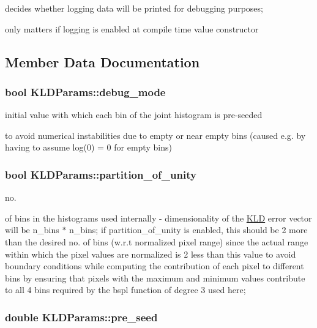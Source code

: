 decides whether logging data will be printed for debugging purposes; 

only matters if logging is enabled at compile time value constructor 

\subsection{Member Data Documentation}
\hypertarget{structKLDParams_a6d3291657c80427cc7ff6b443785b153}{
\subsubsection[{debug\-\_\-mode}]{\setlength{\rightskip}{0pt plus 5cm}bool K\-L\-D\-Params\-::debug\-\_\-mode}}\label{structKLDParams_a6d3291657c80427cc7ff6b443785b153}


initial value with which each bin of the joint histogram is pre-\/seeded 

to avoid numerical instabilities due to empty or near empty bins (caused e.\-g. by having to assume log(0) = 0 for empty bins) \hypertarget{structKLDParams_a3ff869b777a4da12a6363efb3cfa7c96}{
\subsubsection[{partition\-\_\-of\-\_\-unity}]{\setlength{\rightskip}{0pt plus 5cm}bool K\-L\-D\-Params\-::partition\-\_\-of\-\_\-unity}}\label{structKLDParams_a3ff869b777a4da12a6363efb3cfa7c96}


no. 

of bins in the histograms used internally -\/ dimensionality of the \hyperlink{classKLD}{K\-L\-D} error vector will be n\-\_\-bins $\ast$ n\-\_\-bins; if partition\-\_\-of\-\_\-unity is enabled, this should be 2 more than the desired no. of bins (w.\-r.\-t normalized pixel range) since the actual range within which the pixel values are normalized is 2 less than this value to avoid boundary conditions while computing the contribution of each pixel to different bins by ensuring that pixels with the maximum and minimum values contribute to all 4 bins required by the bspl function of degree 3 used here; \hypertarget{structKLDParams_a43ee8c254eada2e6e722201083fb542c}{
\subsubsection[{pre\-\_\-seed}]{\setlength{\rightskip}{0pt plus 5cm}double K\-L\-D\-Params\-::pre\-\_\-seed}}\label{structKLDParams_a43ee8c254eada2e6e722201083fb542c}


